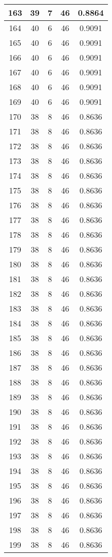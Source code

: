 \documentclass[letterpaper, 12pt]{article}
\begin{document}
\begin{longtable}{|c|c|c|c|c|}
\hline
163 & 39 & 7 & 46 & 0.8864 \\
\hline
164 & 40 & 6 & 46 & 0.9091 \\
\hline
165 & 40 & 6 & 46 & 0.9091 \\
\hline
166 & 40 & 6 & 46 & 0.9091 \\
\hline
167 & 40 & 6 & 46 & 0.9091 \\
\hline
168 & 40 & 6 & 46 & 0.9091 \\
\hline
169 & 40 & 6 & 46 & 0.9091 \\
\hline
170 & 38 & 8 & 46 & 0.8636 \\
\hline
171 & 38 & 8 & 46 & 0.8636 \\
\hline
172 & 38 & 8 & 46 & 0.8636 \\
\hline
173 & 38 & 8 & 46 & 0.8636 \\
\hline
174 & 38 & 8 & 46 & 0.8636 \\
\hline
175 & 38 & 8 & 46 & 0.8636 \\
\hline
176 & 38 & 8 & 46 & 0.8636 \\
\hline
177 & 38 & 8 & 46 & 0.8636 \\
\hline
178 & 38 & 8 & 46 & 0.8636 \\
\hline
179 & 38 & 8 & 46 & 0.8636 \\
\hline
180 & 38 & 8 & 46 & 0.8636 \\
\hline
181 & 38 & 8 & 46 & 0.8636 \\
\hline
182 & 38 & 8 & 46 & 0.8636 \\
\hline
183 & 38 & 8 & 46 & 0.8636 \\
\hline
184 & 38 & 8 & 46 & 0.8636 \\
\hline
185 & 38 & 8 & 46 & 0.8636 \\
\hline
186 & 38 & 8 & 46 & 0.8636 \\
\hline
187 & 38 & 8 & 46 & 0.8636 \\
\hline
188 & 38 & 8 & 46 & 0.8636 \\
\hline
189 & 38 & 8 & 46 & 0.8636 \\
\hline
190 & 38 & 8 & 46 & 0.8636 \\
\hline
191 & 38 & 8 & 46 & 0.8636 \\
\hline
192 & 38 & 8 & 46 & 0.8636 \\
\hline
193 & 38 & 8 & 46 & 0.8636 \\
\hline
194 & 38 & 8 & 46 & 0.8636 \\
\hline
195 & 38 & 8 & 46 & 0.8636 \\
\hline
196 & 38 & 8 & 46 & 0.8636 \\
\hline
197 & 38 & 8 & 46 & 0.8636 \\
\hline
198 & 38 & 8 & 46 & 0.8636 \\
\hline
199 & 38 & 8 & 46 & 0.8636 \\
\hline
\end{longtable}
\end{document}
